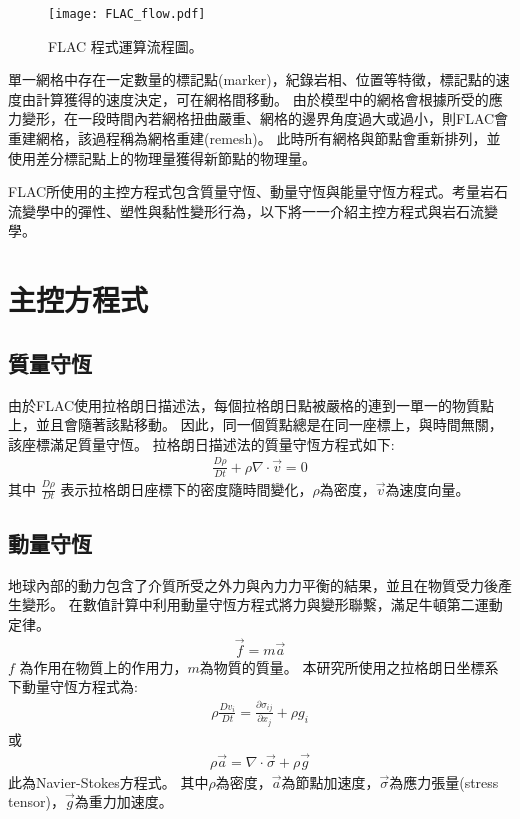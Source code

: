 \begin{figure*}[ht!]
    \centering
    \texttt{[image: FLAC\_flow.pdf]}
    \caption[FLAC 程式運算流程圖]{FLAC 程式運算流程圖。}
    \label{fig::FLAC_method}
\end{figure*}
單一網格中存在一定數量的標記點(marker)，紀錄岩相、位置等特徵，標記點的速度由計算獲得的速度決定，可在網格間移動。
由於模型中的網格會根據所受的應力變形，在一段時間內若網格扭曲嚴重、網格的邊界角度過大或過小，則FLAC會重建網格，該過程稱為網格重建(remesh)。
此時所有網格與節點會重新排列，並使用差分標記點上的物理量獲得新節點的物理量。

FLAC所使用的主控方程式包含質量守恆、動量守恆與能量守恆方程式。考量岩石流變學中的彈性、塑性與黏性變形行為，以下將一一介紹主控方程式與岩石流變學。
\section{主控方程式}

\subsection{質量守恆}
由於FLAC使用拉格朗日描述法，每個拉格朗日點被嚴格的連到一單一的物質點上，並且會隨著該點移動。
因此，同一個質點總是在同一座標上，與時間無關，該座標滿足質量守恆。
拉格朗日描述法的質量守恆方程式如下:
\begin{align}
\frac{D\rho}{Dt}+\rho\nabla\cdot\vec v =0 
\label{eqn:MASS_Lagrangian}
\end{align}
其中 $\frac{D\rho}{Dt}$ 表示拉格朗日座標下的密度隨時間變化，$\rho$為密度，$\vec v$為速度向量。

\subsection{動量守恆}
地球內部的動力包含了介質所受之外力與內力力平衡的結果，並且在物質受力後產生變形。
在數值計算中利用動量守恆方程式將力與變形聯繫，滿足牛頓第二運動定律。
\begin{align}
\vec f=m\vec a
\end{align}
$f$ 為作用在物質上的作用力，$m$為物質的質量。
本研究所使用之拉格朗日坐標系下動量守恆方程式為:
\begin{align}
\rho \frac{ Dv_{i}}{Dt} = \frac{\partial \sigma_{ij}}{\partial x_j}+\rho g_i\label{eqn:momentum Lagrangian}
\end{align}
或
\begin{align}
\rho \vec a = \nabla\cdot\vec\sigma+\rho\vec g\label{eqn:momentum Lagrangian2}
\end{align}
此為Navier-Stokes方程式。 其中$\rho$為密度，$\vec a$為節點加速度，$\vec\sigma$為應力張量(stress tensor)，$\vec g$為重力加速度。

